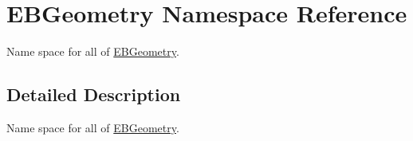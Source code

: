 \hypertarget{namespaceEBGeometry}{}\section{E\+B\+Geometry Namespace Reference}
\label{namespaceEBGeometry}


Name space for all of \hyperlink{namespaceEBGeometry}{E\+B\+Geometry}.  




\subsection{Detailed Description}
Name space for all of \hyperlink{namespaceEBGeometry}{E\+B\+Geometry}. 